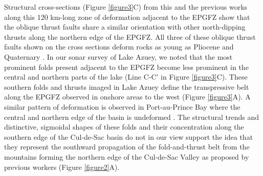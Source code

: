 \documentclass[man,natbib]{apa6}
\begin{document}
Structural cross-sections (Figure \ref{figure3}C) from this and the previous works \citep{massoni1955haiti,douilly2015three} along this 120 km-long zone of deformation adjacent to the EPGFZ show that the oblique thrust faults share a similar orientation with other north-dipping thrusts along the northern edge of the EPGFZ. All three of these oblique thrust faults shown on the cross sections deform rocks as young as Pliocene and Quaternary \citep{saint2015seismotectonics}. In our sonar survey of Lake Azuey, we noted that the most prominent folds present adjacent to the EPGFZ become less prominent in the central and northern parts of the lake (Line C-C' in Figure \ref{figure3}C). These southern folds and thrusts imaged in Lake Azuey define the transpressive belt along the EPGFZ observed in onshore areas to the west (Figure \ref{figure3}A). A similar pattern of deformation is observed in Port-au-Prince Bay where the central and northern edge of the basin is undeformed \citep{massoni1955haiti,mchugh2011offshore,saint2015seismotectonics}. The structural trends and distinctive, sigmoidal shapes of these folds and their concentration along the southern edge of the Cul-de-Sac basin do not in our view support the idea that they represent the southward propagation of the fold-and-thrust belt from the mountains forming the northern edge of the Cul-de-Sac Valley as proposed by previous workers \citep{calais2010transpressional} (Figure \ref{figure2}A). 
%
\end{document}
